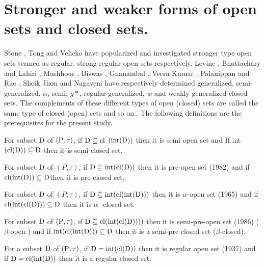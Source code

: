 \section{Stronger and weaker forms of open sets and closed sets.}

Stone \cite{key88}, Tong \cite{key91} and Velicko \cite{key94} have popularized and investigated stronger type open sets termed as regular, strong regular open sets respectively. Levine \cite{key50}, Bhattachary and Lahiri \cite{key15}, Mashhour \cite{key60}, Biswas \cite{key16}, Gnanambal \cite{key39}, Veera Kumar \cite{key93}, Palanippan and Rao \cite{key72}, Sheik Jhon \cite{key84} and Nagaveni \cite{key65} have respectively determined generalized, semi-generalized, $\alpha$, semi, $g*$, regular generalized, $w$ and weakly generalized closed sets. The complements of these different types of open (closed) sets are called the same type of closed (open) sets and so on.. The following definitions are the prerequisites for the present study.

\begin{dfn}\label{dfn1.2.1}
For subset $\mathrm{D}$ of $(\mathrm{P}, \tau)$, if $\mathrm{D} \subseteq \mathrm{cl}$ $(\mbox{int} (\mathrm{D}))$ then it is semi open set and 
If int $(\mathrm{cl}(\mathrm{D})) \subseteq \mathrm{D}$ then it is semi closed set.
\end{dfn}

\begin{dfn}\label{dfn1.2.2}
For subset $\mathrm{D}$ of $(P, \tau)$, if $\mathrm{D} \subseteq \mbox{int}(\mathrm{cl}(\mathrm{D}))$ then it is pre-open set (1982) and if $\mathrm{cl}(\mbox{int}(\mathrm{D})) \subseteq \mathrm{D}$then it is pre-closed set. 
\end{dfn}

\begin{dfn}\label{dfn1.2.3}
For subset $\mathrm{D}$ of $(P, \tau)$, if $\mathrm{D} \subseteq\mbox{int} (\mathrm{cl}(\mbox{int}(\mathrm{D})))$ then it is $\alpha$-open set (1965) and if $\mathrm{cl}(\mbox{int}(\mathrm{cl}(\mathrm{D})))\subseteq \mathrm{D}$ then it is $\alpha$ -closed set. 
\end{dfn}

\begin{dfn}\label{dfn1.2.4}
For subset $\mathrm{D}$ of $(\mathrm{P}, \tau)$, if $\mathrm{D} \subseteq \mathrm{cl}(\mbox{int}(\mathrm{cl}(\mathrm{D}))))$ then it is semi-pre-open set (1986) ($\beta$-open \cite{key1} ) and if $\mbox{int}(\mathrm{cl}(\mbox{int}(\mathrm{D}))) \subseteq \mathrm{D}$ then it is a semi-pre closed set ($\beta$-closed). 
\end{dfn}

\begin{dfn}\label{dfn1.2.5}
For a subset $\mathrm{D}$ of $(\mathrm{P}, \tau)$, if $\mathrm{D} = \mbox{int} (\mathrm{cl}(\mathrm{D}))$ then it is regular open set (1937) and if $\mathrm{D} = \mathrm{cl}(\mbox{int}(\mathrm{D}))$ then it is a regular closed set. 
\end{dfn}

